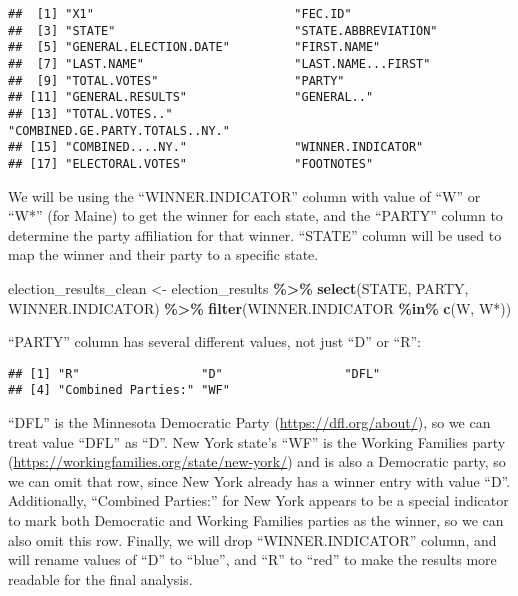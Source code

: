 \documentclass[
]{article}
\newenvironment{Shaded}{\begin{snugshade}}{\end{snugshade}}
\newcommand{\FunctionTok}[1]{\textcolor[rgb]{0.13,0.29,0.53}{\textbf{#1}}}
\newcommand{\NormalTok}[1]{#1}
\newcommand{\OtherTok}[1]{\textcolor[rgb]{0.56,0.35,0.01}{#1}}
\newcommand{\SpecialCharTok}[1]{\textcolor[rgb]{0.81,0.36,0.00}{\textbf{#1}}}
\newcommand{\StringTok}[1]{\textcolor[rgb]{0.31,0.60,0.02}{#1}}
\begin{document}
\begin{verbatim}
##  [1] "X1"                            "FEC.ID"                       
##  [3] "STATE"                         "STATE.ABBREVIATION"           
##  [5] "GENERAL.ELECTION.DATE"         "FIRST.NAME"                   
##  [7] "LAST.NAME"                     "LAST.NAME...FIRST"            
##  [9] "TOTAL.VOTES"                   "PARTY"                        
## [11] "GENERAL.RESULTS"               "GENERAL.."                    
## [13] "TOTAL.VOTES.."                 "COMBINED.GE.PARTY.TOTALS..NY."
## [15] "COMBINED....NY."               "WINNER.INDICATOR"             
## [17] "ELECTORAL.VOTES"               "FOOTNOTES"
\end{verbatim}

We will be using the ``WINNER.INDICATOR'' column with value of ``W'' or
``W*'' (for Maine) to get the winner for each state, and the ``PARTY''
column to determine the party affiliation for that winner. ``STATE''
column will be used to map the winner and their party to a specific
state.

\begin{Shaded}
\begin{Highlighting}[]
\NormalTok{election\_results\_clean }\OtherTok{\textless{}{-}}\NormalTok{ election\_results }\SpecialCharTok{\%\textgreater{}\%}
  \FunctionTok{select}\NormalTok{(STATE, PARTY, WINNER.INDICATOR) }\SpecialCharTok{\%\textgreater{}\%}
  \FunctionTok{filter}\NormalTok{(WINNER.INDICATOR }\SpecialCharTok{\%in\%} \FunctionTok{c}\NormalTok{(}\StringTok{\textquotesingle{}W\textquotesingle{}}\NormalTok{, }\StringTok{\textquotesingle{}W*\textquotesingle{}}\NormalTok{))}
\end{Highlighting}
\end{Shaded}

``PARTY'' column has several different values, not just ``D'' or ``R'':

\begin{Shaded}
\end{Shaded}

\begin{verbatim}
## [1] "R"                 "D"                 "DFL"              
## [4] "Combined Parties:" "WF"
\end{verbatim}

``DFL'' is the Minnesota Democratic Party
(\url{https://dfl.org/about/}), so we can treat value ``DFL'' as ``D''.
New York state's ``WF'' is the Working Families party
(\url{https://workingfamilies.org/state/new-york/}) and is also a
Democratic party, so we can omit that row, since New York already has a
winner entry with value ``D''. Additionally, ``Combined Parties:'' for
New York appears to be a special indicator to mark both Democratic and
Working Families parties as the winner, so we can also omit this row.
Finally, we will drop ``WINNER.INDICATOR'' column, and will rename
values of ``D'' to ``blue'', and ``R'' to ``red'' to make the results
more readable for the final analysis.
\end{document}
